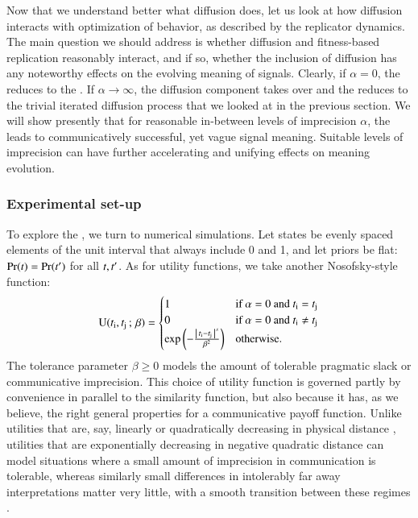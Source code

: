 \documentclass[fleqn,reqno,10pt]{article}
\newcommand{\rd}{\acro{rd}} %
\newcommand{\rdd}{\acro{rdd}} %
\newcommand{\impairment}{\ensuremath{\alpha}} %
\newcommand{\toler}{\ensuremath{\beta}} %
\begin{document}
Now that we understand better what diffusion does, let us look at how
diffusion interacts with optimization of behavior, as described by the
replicator dynamics. The main question we should address is whether
diffusion and fitness-based replication reasonably interact, and if
so, whether the inclusion of diffusion has any noteworthy effects on
the evolving meaning of signals. Clearly, if $\impairment = 0$, the
\rdd reduces to the \rd. If $\impairment \rightarrow \infty$, the
diffusion component takes over and the \rdd reduces to the trivial
iterated diffusion process that we looked at in the previous
section. We will show presently that for reasonable in-between levels
of imprecision $\impairment$, the \rdd leads to communicatively
successful, yet vague signal meaning. Suitable levels of imprecision
can have further accelerating and unifying effects on meaning
evolution.

\subsubsection{Experimental set-up}

To explore the \rdd, we turn to numerical simulations. Let states be
evenly spaced elements of the unit interval that always include 0 and
1, and let priors be flat: $\Pr(t) = \Pr(t')$ for all
$t, t'$. As for utility functions, we take another
Nosofsky-style function:
\begin{align*}
  \util(\mystate{i}, \mystate{j} \myts ; \myts \toler) =
      \begin{cases}
    1 & \textrm{if } \impairment = 0 \textrm{ and } \mystate{i} = \mystate{j} \\
    0 & \textrm{if } \impairment = 0 \textrm{ and } \mystate{i} \neq \mystate{j} \\
 \expo \left ( -  \frac{\card{\mystate{i} - \mystate{j}}^s}{ \toler^2} \right ) & \textrm{otherwise.} \\
    \end{cases}
\end{align*}
The tolerance parameter $\toler \ge 0$ models the amount of tolerable
pragmatic slack or communicative imprecision. This choice of utility
function is governed partly by convenience in parallel to the
similarity function, but also because it has, as we believe, the right
general properties for a communicative payoff function. Unlike
utilities that are, say, linearly or quadratically decreasing in
physical distance \citep[c.f.][]{JagerMetzger2011:Voronoi-Languag,FrankeJager2010:Vagueness-Signa},
utilities that are exponentially decreasing in negative quadratic
distance can model situations where a small amount of imprecision in
communication is tolerable, whereas similarly small differences in
intolerably far away interpretations matter very little, with a smooth
transition between these regimes
\citep[c.f.][]{OConnor2013:The-Evolution-o}.
\end{document}
